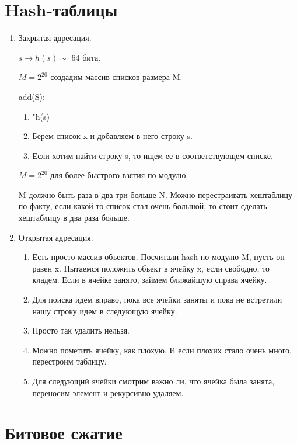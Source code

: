 \chapter{Hash-таблицы}
    \begin{enumerate}
    \item Закрытая адресация. 
    
    $s \to h(s) \sim$ 64 бита.
    
     $M = 2^{20}$ создадим массив списков размера M.

     add(S):
     \begin{enumerate}
     \item \cpp"h(s) %
     \item Берем список x и добавляем в него строку s.
     \item Если хотим найти строку s, то ищем ее в соответствующем списке.
     \end{enumerate}

     $M = 2^{20}$ для более быстрого взятия по модулю.

     M должно быть раза в два-три больше N. Можно перестраивать хештаблицу по факту, если какой-то список стал очень большой, 
     то стоит сделать хештаблицу в два раза больше.
    \item Открытая адресация.
    
    \begin{enumerate}
    \item Есть просто массив объектов. Посчитали hash по модулю M, пусть он равен x. Пытаемся положить объект в ячейку x, если свободно, то кладем. Если в ячейке занято, займем ближайшую справа ячейку. 
    \item Для поиска идем вправо, пока все ячейки заняты и пока не встретили нашу строку идем в следующую 
    ячейку.
    \item Просто так удалить нельзя.
    \item Можно пометить ячейку, как плохую. И если плохих стало очень много, перестроим таблицу.
    \item Для следующий ячейки смотрим важно ли, что ячейка была занята, переносим элемент и рекурсивно удаляем. 
    \end{enumerate}

    \end{enumerate}

\chapter{Битовое сжатие}

